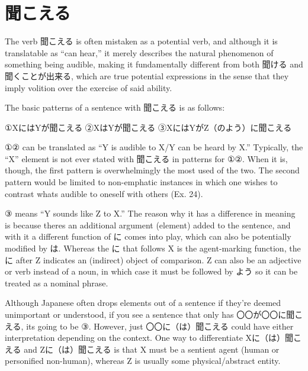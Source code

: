 \section{聞こえる}
 
\par{ The verb 聞こえる is often mistaken as a potential verb, and although it is translatable as “can hear,” it merely describes the natural phenomenon of something being audible, making it fundamentally different from both 聞ける and 聞くことが出来る, which are true potential expressions in the sense that they imply volition over the exercise of said ability. }

\par{ The basic patterns of a sentence with 聞こえる is as follows: }

\par{①XにはYが聞こえる \hfill\break
②XはYが聞こえる \hfill\break
③XにはYがZ（のよう）に聞こえる }

\par{ ①② can be translated as “Y is audible to X\slash Y can be heard by X.” Typically, the “X” element is not ever stated with 聞こえる in patterns for ①②. When it is, though, the first pattern is overwhelmingly the most used of the two. The second pattern would be limited to non-emphatic instances in which one wishes to contrast what\textquotesingle s audible to oneself with others (Ex. 24). }

\par{ ③ means “Y sounds like Z to X.” The reason why it has a difference in meaning is because there\textquotesingle s an additional argument (element) added to the sentence, and with it a different function of に comes into play, which can also be potentially modified by は. Whereas the に that follows X is the agent-marking function, the に after Z indicates an (indirect) object of comparison. Z can also be an adjective or verb instead of a noun, in which case it must be followed by よう so it can be treated as a nominal phrase. }

\par{ Although Japanese often drops elements out of a sentence if they're deemed unimportant or understood, if you see a sentence that only has 〇〇が〇〇に聞こえる, it\textquotesingle s going to be ③. However, just 〇〇に（は）聞こえる could have either interpretation depending on the context. One way to differentiate Xに（は）聞こえる and Zに（は）聞こえる is that X must be a sentient agent (human or personified non-human), whereas Z is usually some physical\slash abstract entity. }

